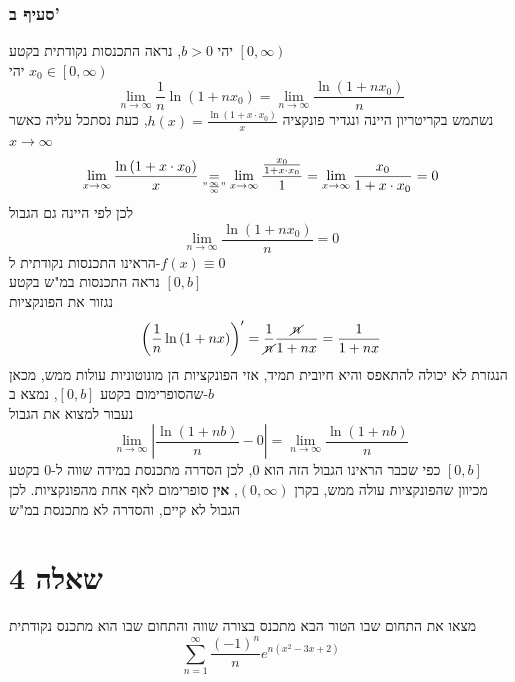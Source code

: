 \documentclass[12pt, titlepage]{article}
\begin{document}
\section*{סעיף ב'}
יהי $b>0$, נראה התכנסות נקודתית בקטע $\left[0,\infty\right)$\\
יהי $x_0 \in \left[0,\infty\right)$
\[
    \lim_{n\to\infty} \frac{1}{n} \ln\left(1+nx_0\right) = \lim_{n\to\infty} \frac{\ln\left(1+nx_0\right)}{n}
\]
נשתמש בקריטריון היינה ונגדיר פונקציה $h(x)= \frac{\ln(1+x\cdot x_0)}{x}$, כעת נסתכל עליה כאשר $x\to\infty$
\[
    \lim_{x\to\infty} \frac{\ln\left(1+x\cdot x_0\right)}{x} \underset{"\frac{\infty}{\infty}"}{=} \lim_{x\to\infty} \frac{\frac{x_0}{1+x\cdot x_0}}{1} = \lim_{x\to\infty} \frac{x_0}{1+x \cdot x_0} = 0
\]
לכן לפי היינה גם הגבול
\[
 \lim_{n\to\infty} \frac{\ln\left(1+nx_0\right)}{n} = 0
\]
הראינו התכנסות נקודתית ל-$f(x)\equiv 0$\\
נראה התכנסות במ"ש בקטע $\left[0,b\right]$\\
נגזור את הפונקציות
\[
    \left(\frac{1}{n}\ln\left(1+nx\right)\right)' = \frac{1}{\cancel{n}}\frac{\cancel{n}}{1+nx} = \frac{1}{1+nx}
\]
הנגזרת לא יכולה להתאפס והיא חיובית תמיד, אזי הפונקציות הן מונוטוניות עולות ממש, מכאן שהסופרימום בקטע $\left[0,b\right]$, נמצא ב-$b$\\
נעבור למצוא את הגבול
\[
    \lim_{n\to\infty} \left|\frac{\ln\left(1+nb\right)}{n} - 0\right| = \lim_{n\to\infty} \frac{\ln\left(1+nb\right)}{n}
\]
כפי שכבר הראינו הגבול הזה הוא $0$, לכן הסדרה מתכנסת במידה שווה ל-$0$ בקטע $\left[0,b\right]$\\
מכיוון שהפונקציות עולה ממש, בקרן $\left(0,\infty\right)$, \textbf{אין} סופרימום לאף אחת מהפונקציות. לכן הגבול לא קיים, והסדרה לא מתכנסת במ"ש
\newpage
\part*{שאלה 4}
מצאו את התחום שבו הטור הבא מתכנס בצורה שווה והתחום שבו הוא מתכנס נקודתית
\[
    \sum_{n=1}^\infty \frac{\left(-1\right)^n}{n}e^{n\left(x^2-3x+2\right)}
\]
\end{document}
